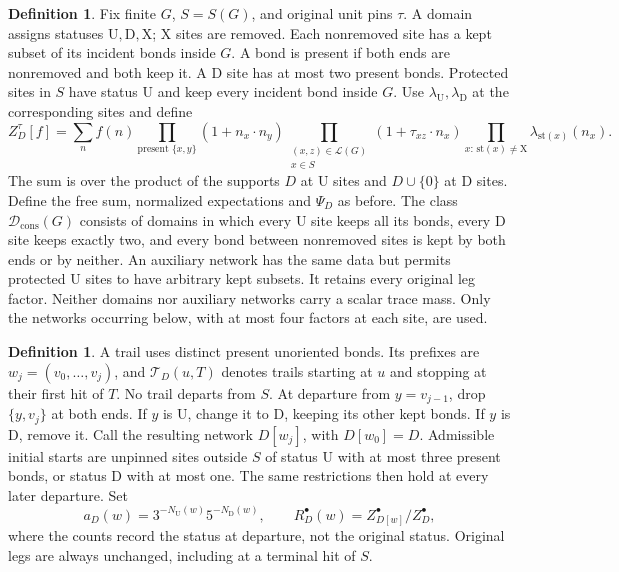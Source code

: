\documentclass[11pt,reqno]{amsart}
\theoremstyle{definition}
\newtheorem{definition}[theorem]{Definition}
\theoremstyle{remark}
\begin{document}
\begin{definition}\label{d:domain}
Fix finite \(G\), \(S=S(G)\), and original unit pins \(\tau\).
A domain assigns statuses \(\mathrm U,\mathrm D,\mathrm X\);
\(\mathrm X\) sites are removed. Each nonremoved site has a kept
subset of its incident bonds inside \(G\). A bond is present if both
ends are nonremoved and both keep it. A \(\mathrm D\) site has at
most two present bonds. Protected sites in \(S\) have status
\(\mathrm U\) and keep every incident bond inside \(G\).
Use \(\lambda_{\mathrm U},\lambda_{\mathrm D}\) at the corresponding
sites and define
\[
 Z_D^\tau[f]=\sum_n f(n)
       \prod_{\text{present }\{x,y\}}(1+n_x\cdot n_y)
       \prod_{\substack{(x,z)\in\mathcal L(G)\\x\in S}}
                   (1+\tau_{xz}\cdot n_x)
       \prod_{x:\,\mathrm{st}(x)\ne\mathrm X}\lambda_{\mathrm{st}(x)}(n_x).
\]
The sum is over the product of the supports \(D\) at \(\mathrm U\)
sites and \(D\cup\{0\}\) at \(\mathrm D\) sites.
Define the free sum, normalized expectations and \(\Psi_D\) as before.
The class \(\mathcal D_{\mathrm{cons}}(G)\) consists of domains in
which every \(\mathrm U\) site keeps all its bonds, every \(\mathrm D\)
site keeps exactly two, and every bond between nonremoved sites is
kept by both ends or by neither.
An auxiliary network has the same data but permits protected
\(\mathrm U\) sites to have arbitrary kept subsets. It retains every
original leg factor. Neither domains nor auxiliary networks carry
a scalar trace mass. Only the networks occurring below, with at most
four factors at each site, are used.
\end{definition}

\begin{definition}\label{d:trace}
A trail uses distinct present unoriented bonds. Its prefixes are
\(w_j=(v_0,\ldots,v_j)\), and \(\mathcal T_D(u,T)\) denotes trails
starting at \(u\) and stopping at their first hit of \(T\).
No trail departs from \(S\).
At departure from \(y=v_{j-1}\), drop \(\{y,v_j\}\) at both ends.
If \(y\) is \(\mathrm U\), change it to \(\mathrm D\), keeping its
other kept bonds. If \(y\) is \(\mathrm D\), remove it.
Call the resulting network \(D[w_j]\), with \(D[w_0]=D\).
Admissible initial starts are unpinned sites outside \(S\) of status
\(\mathrm U\) with at most three present bonds, or status \(\mathrm D\)
with at most one. The same restrictions then hold at every later
departure. Set
\[
 a_D(w)=3^{-N_{\mathrm U}(w)}5^{-N_{\mathrm D}(w)},\qquad
 R_D^\bullet(w)=Z^\bullet_{D[w]}/Z^\bullet_D,
\]
where the counts record the status at departure, not the original status.
Original legs are always unchanged, including at a terminal hit of \(S\).
\end{definition}
\end{document}
